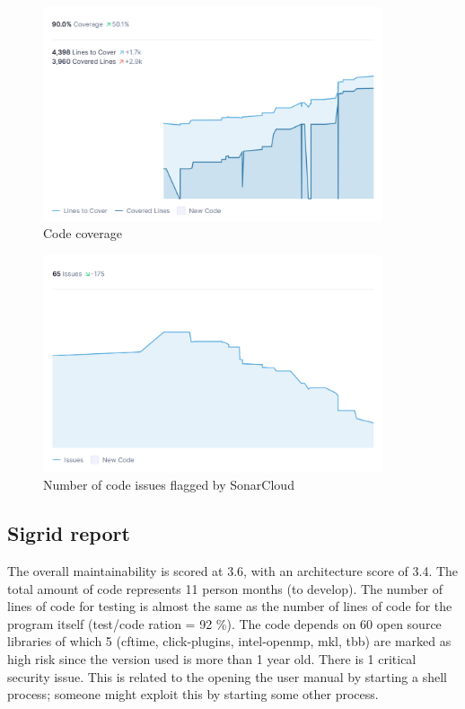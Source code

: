 \begin{figure}
\center
\includegraphics[width=10cm]{figures/code_coverage.png}
\caption{Code coverage}
\label{fig:code_coverage}
\end{figure}

\begin{figure}
\center
\includegraphics[width=10cm]{figures/code_issues.png}
\caption{Number of code issues flagged by SonarCloud}
\label{fig:code_issues}
\end{figure}

\subsection{Sigrid report}
The overall maintainability is scored at 3.6, with an architecture score of 3.4.
The total amount of code represents 11 person months (to develop).
The number of lines of code for testing is almost the same as the number of lines of code for the program itself (test/code ration = 92 \%).
The code depends on 60 open source libraries of which 5 (cftime, click-plugins, intel-openmp, mkl, tbb) are marked as high risk since the version used is more than 1 year old.
There is 1 critical security issue.
This is related to the opening the user manual by starting a shell process; someone might exploit this by starting some other process.

